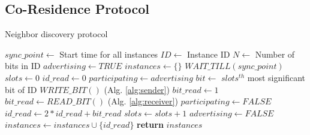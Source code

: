 \subsection{Co-Residence Protocol}
\label{sec:protocol}


\begin{algorithm}[!t]
\caption{Neighbor discovery protocol}
\label{alg:protcol}
\begin{algorithmic}[1]
\STATE $sync\_point \leftarrow$ {Start time for all instances}
\STATE $ID \leftarrow$ {Instance ID}
\STATE $N \leftarrow$ {Number of bits in ID}
\STATE $advertising \leftarrow TRUE$
\STATE $instances \leftarrow \{\} $
\STATE $WAIT\_TILL(sync\_point)$
    \STATE $slots \leftarrow 0$
    \STATE $id\_read \leftarrow 0$
    \STATE $participating \leftarrow advertising$
        \STATE $bit \leftarrow$ {$slots^{th}$ most significant bit of ID}
            \STATE $WRITE\_BIT()$               (Alg. \ref{alg:sender})
            \STATE $bit\_read \leftarrow 1$
        \ELSE
            \STATE $bit\_read \leftarrow READ\_BIT()$       (Alg. \ref{alg:receiver})
                \STATE $participating \leftarrow FALSE$
            \ENDIF
        \ENDIF
        \STATE $id\_read \leftarrow 2 * id\_read + bit\_read$
        \STATE $slots \leftarrow slots + 1$
    \ENDWHILE
        \STATE $advertising \leftarrow FALSE$
    \ENDIF
    \STATE $instances \leftarrow instances \cup \{id\_read\}$
\ENDWHILE
\STATE \textbf{return} $instances$
\end{algorithmic}
\end{algorithm}


